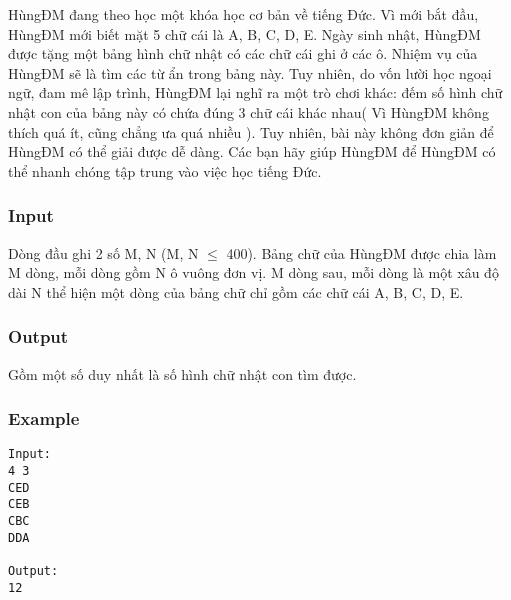 



   HùngĐM đang theo học một khóa học cơ bản về tiếng Đức. Vì mới bắt đầu, HùngĐM mới biết mặt 5 chữ cái là A, B, C, D, E. Ngày sinh nhật, HùngĐM được tặng một bảng hình chữ nhật có các chữ cái ghi ở các ô. Nhiệm vụ của HùngĐM sẽ là tìm các từ ẩn trong bảng này. Tuy nhiên, do vốn lười học ngoại ngữ, đam mê lập trình, HùngĐM lại nghĩ ra một trò chơi khác: đếm số hình chữ nhật con của bảng này có chứa đúng 3 chữ cái khác nhau( Vì HùngĐM không thích quá ít, cũng chẳng ưa quá nhiều ). Tuy nhiên, bài này không đơn giản để HùngĐM có thể giải được dễ dàng. Các bạn hãy giúp HùngĐM để HùngĐM có thể nhanh chóng tập trung vào việc học tiếng Đức.  

\subsubsection{   Input  }

   Dòng đầu ghi 2 số M, N (M, N  $\le$  400). Bảng chữ của HùngĐM được chia làm M dòng, mỗi dòng gồm N ô vuông đơn vị. M dòng sau, mỗi dòng là một xâu độ dài N thể hiện một dòng của bảng chữ chỉ gồm các chữ cái A, B, C, D, E.  

\subsubsection{   Output  }

   Gồm một số duy nhất là số hình chữ nhật con tìm được.  

\subsubsection{   Example  }
\begin{verbatim}
Input:
4 3
CED
CEB
CBC
DDA

Output:
12
\end{verbatim}
